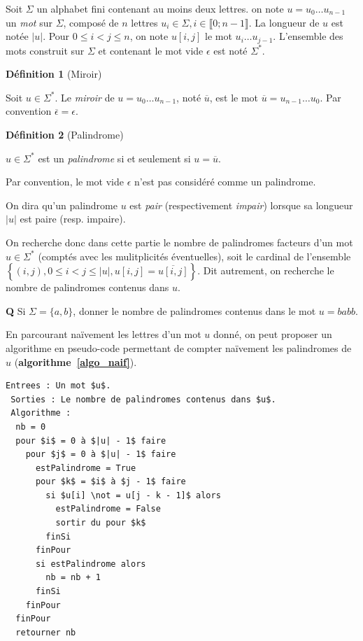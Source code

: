 \documentclass[11pt,a4paper,french]{article}
\newcommand{\Leq}{\leqslant}
\newcounter{numQ}
\newcommand{\debquestion}{\refstepcounter{numQ}
  \columnratio{0.07}
  \medskip
  \paracol{2}
  \textbf{Q\arabic{numQ}}
  \switchcolumn
  \noindent}
\newcommand{\finquestion}{\endparacol\medskip}
\newenvironment{question}{\debquestion}{\finquestion}
\newcommand{\eps}{\epsilon}
\begin{document}
Soit $\Sigma$ un alphabet fini contenant au moins deux lettres. on note $u = u_0 \dots u_{n-1}$ un \emph{mot} sur $\Sigma$, composé de $n$ lettres $u_i \in \Sigma, i \in \llbracket 0; n - 1 \rrbracket$. La longueur de $u$ est notée $|u|$. Pour $0 \Leq i < j \Leq n$, on note $u[i,j]$ le mot $u_i \dots u_{j-1}$. L'ensemble des mots construit sur $\Sigma$ et contenant le mot vide $\eps$ est noté $\Sigma^*$.

\medskip

\textbf{Définition 1} (Miroir)

Soit $u \in \Sigma^*$. Le \emph{miroir} de $u = u_0 \dots u_{n-1}$, noté $\overline{u}$, est le mot $\overline{u} = u_{n-1} \dots u_0$. Par convention $\overline{\eps} = \eps$.

\medskip

\textbf{Définition 2} (Palindrome)

$u \in \Sigma^*$ est un \emph{palindrome} si et seulement si $u = \overline{u}$.

\medskip

Par convention, le mot vide $\eps$ n'est pas considéré comme un palindrome.

On dira qu'un palindrome $u$ est \emph{pair} (respectivement \emph{impair}) lorsque sa longueur $|u|$ est paire (resp. impaire).

On recherche donc dans cette partie le nombre de palindromes facteurs d'un mot $u \in \Sigma^*$ (comptés avec les mulitplicités éventuelles), soit le cardinal de l'ensemble $\left\{ (i,j), 0 \Leq i < j \Leq |u|, u[i,j] = \overline{u[i,j]} \right\}$. Dit autrement, on recherche le nombre de palindromes contenus dans $u$.

\begin{question}
  Si $\Sigma = \{a,b\}$, donner le nombre de palindromes contenus dans le mot $u = babb$.
\end{question}

En parcourant naïvement les lettres d'un mot $u$ donné, on peut proposer un algorithme en pseudo-code permettant de compter naïvement les palindromes de $u$ (\textbf{algorithme~\ref{algo_naif}}).

\begin{lstlisting}[caption={Décompte naïf du nombre de palindromes contenu dans un mot donné},
    label=algo_naif]
 Entrees : Un mot $u$.
 Sorties : Le nombre de palindromes contenus dans $u$.
 Algorithme :
  nb = 0
  pour $i$ = 0 à $|u| - 1$ faire
    pour $j$ = 0 à $|u| - 1$ faire
      estPalindrome = True
      pour $k$ = $i$ à $j - 1$ faire
        si $u[i] \not = u[j - k - 1]$ alors 
          estPalindrome = False
          sortir du pour $k$
        finSi
      finPour    
      si estPalindrome alors
        nb = nb + 1    
      finSi
    finPour
  finPour
  retourner nb
\end{lstlisting}
\end{document}
